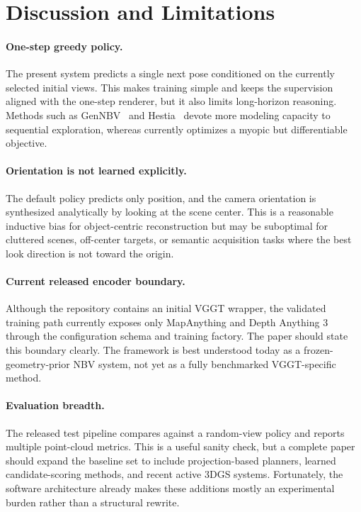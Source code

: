 \section{Discussion and Limitations}
\label{sec:discussion}

\paragraph{One-step greedy policy.}
The present system predicts a single next pose conditioned on the currently selected initial views. This makes training simple and keeps the supervision aligned with the one-step renderer, but it also limits long-horizon reasoning. Methods such as GenNBV~\cite{chen2024gennbv} and Hestia~\cite{lu2025hestia} devote more modeling capacity to sequential exploration, whereas \method currently optimizes a myopic but differentiable objective.

\paragraph{Orientation is not learned explicitly.}
The default policy predicts only position, and the camera orientation is synthesized analytically by looking at the scene center. This is a reasonable inductive bias for object-centric reconstruction but may be suboptimal for cluttered scenes, off-center targets, or semantic acquisition tasks where the best look direction is not toward the origin.

\paragraph{Current released encoder boundary.}
Although the repository contains an initial VGGT wrapper, the validated training path currently exposes only MapAnything and Depth Anything 3 through the configuration schema and training factory. The paper should state this boundary clearly. The framework is best understood today as a frozen-geometry-prior NBV system, not yet as a fully benchmarked VGGT-specific method.

\paragraph{Evaluation breadth.}
The released test pipeline compares against a random-view policy and reports multiple point-cloud metrics. This is a useful sanity check, but a complete paper should expand the baseline set to include projection-based planners, learned candidate-scoring methods, and recent active 3DGS systems. Fortunately, the software architecture already makes these additions mostly an experimental burden rather than a structural rewrite.

